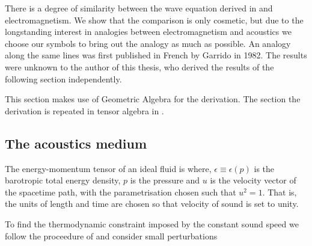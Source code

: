 There is a degree of similarity between the wave equation derived in  and electromagnetism.
We show that the comparison is only cosmetic, 
but due to the longstanding interest in analogies between electromagnetism and acoustics we
choose our symbols to bring out the analogy as much as possible.
An analogy along the same lines was first published in French by Garrido\cite{Garrido1982} in 1982.
The results were unknown to the author of this thesis, who derived the results of the following section independently.

This section makes use of Geometric Algebra\cite{Hestenes1984,Doran2003} for the derivation.
The section the derivation is repeated in tensor algebra in .

\subsection{The acoustics medium}\label{sec:MaxwellAnalogue}

The energy-momentum tensor of an ideal fluid is\cite{LandauBook, Taub1978}
where, $\epsilon \equiv \epsilon(p)$ is the barotropic total energy density,
$p$ is the pressure
and 
$u$ is the velocity vector of the spacetime path, with the parametrisation chosen such that $u^2 =  1$. %
That is, the units of length and time are chosen so that velocity of sound is set to unity.

To find the thermodynamic constraint imposed by the constant sound speed we follow the proceedure of 
and consider small perturbations

